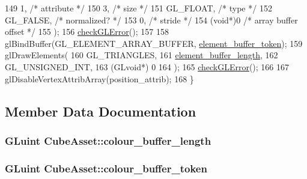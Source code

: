 \begin{DoxyCode}
149     1,        \textcolor{comment}{/* attribute */}
150     3,        \textcolor{comment}{/* size */}
151     GL\_FLOAT,   \textcolor{comment}{/* type */}
152     GL\_FALSE,   \textcolor{comment}{/* normalized? */}
153     0,        \textcolor{comment}{/* stride */}
154     (\textcolor{keywordtype}{void}*)0    \textcolor{comment}{/* array buffer offset */}
155   );
156   \hyperlink{CubeAsset_8cc_a75f201b0e53e68726854997957322b8d}{checkGLError}();
157 
158   glBindBuffer(GL\_ELEMENT\_ARRAY\_BUFFER, \hyperlink{classCubeAsset_a4fae699256e7c5633a8174a93ca8a0ec}{element\_buffer\_token});
159   glDrawElements(
160     GL\_TRIANGLES,
161     \hyperlink{classCubeAsset_ac66c2ec869f392515dad4ebda1fe4792}{element\_buffer\_length},
162     GL\_UNSIGNED\_INT,
163     (GLvoid*) 0
164   );
165   \hyperlink{CubeAsset_8cc_a75f201b0e53e68726854997957322b8d}{checkGLError}();
166 
167   glDisableVertexAttribArray(position\_attrib);
168 \}
\end{DoxyCode}


\subsection{Member Data Documentation}
\hypertarget{classCubeAsset_a12de81acb020b82bd26cda6284910012}{}
\subsubsection[{colour\+\_\+buffer\+\_\+length}]{\setlength{\rightskip}{0pt plus 5cm}G\+Luint Cube\+Asset\+::colour\+\_\+buffer\+\_\+length\hspace{0.3cm}{\ttfamily [private]}}\label{classCubeAsset_a12de81acb020b82bd26cda6284910012}
\hypertarget{classCubeAsset_a75f98d346175cd91cdee04f1885f5327}{}
\subsubsection[{colour\+\_\+buffer\+\_\+token}]{\setlength{\rightskip}{0pt plus 5cm}G\+Luint Cube\+Asset\+::colour\+\_\+buffer\+\_\+token\hspace{0.3cm}{\ttfamily [private]}}\label{classCubeAsset_a75f98d346175cd91cdee04f1885f5327}
\hypertarget{classCubeAsset_ac66c2ec869f392515dad4ebda1fe4792}{}
